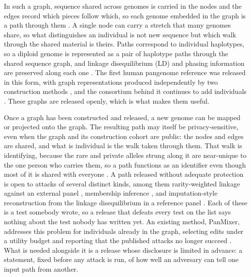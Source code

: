 In such a graph, sequence shared across genomes is carried in the nodes and the edges
record which pieces follow which, so each genome embedded in the graph is a path
through them \cite{eizenga2020}. A single node can carry a stretch that many genomes
share, so what distinguishes an individual is not new sequence but which walk through
the shared material is theirs. Paths correspond to individual haplotypes, so a
diploid genome is represented as a pair of haplotype paths through the shared
sequence graph, and linkage disequilibrium (LD) and phasing information are preserved
along each one \cite{liao2023}. The first human pangenome reference was released in
this form, with graph representations produced independently by two construction
methods \cite{liao2023,garrison2024,hickey2024}, and the consortium behind it
continues to add individuals \cite{wang2022}. These graphs are released openly, which
is what makes them useful.

Once a graph has been constructed and released, a new genome can be mapped or
projected onto the graph. The resulting path may itself be privacy-sensitive, even
when the graph and its construction cohort are public: the nodes and edges are
shared, and what is individual is the walk taken through them. That walk is
identifying, because the rare and private alleles strung along it are near-unique to
the one person who carries them, so a path functions as an identifier even though
most of it is shared with everyone \cite{erlich2014}. A path released without
adequate protection is open to attacks of several distinct kinds, among them
rarity-weighted linkage against an external panel \cite{blindenbach2026}, membership
inference \cite{venkatesaramani2023}, and imputation-style reconstruction from the
linkage disequilibrium in a reference panel \cite{browning2018}. Each of these is a
test somebody wrote, so a release that defeats every test on the list says nothing
about the test nobody has written yet. An existing method, PanMixer, addresses this
problem for individuals already in the graph, selecting edits under a utility budget
and reporting that the published attacks no longer succeed \cite{blindenbach2026}.
What is needed alongside it is a release whose disclosure is limited in advance: a
statement, fixed before any attack is run, of how well an adversary can tell one
input path from another.

